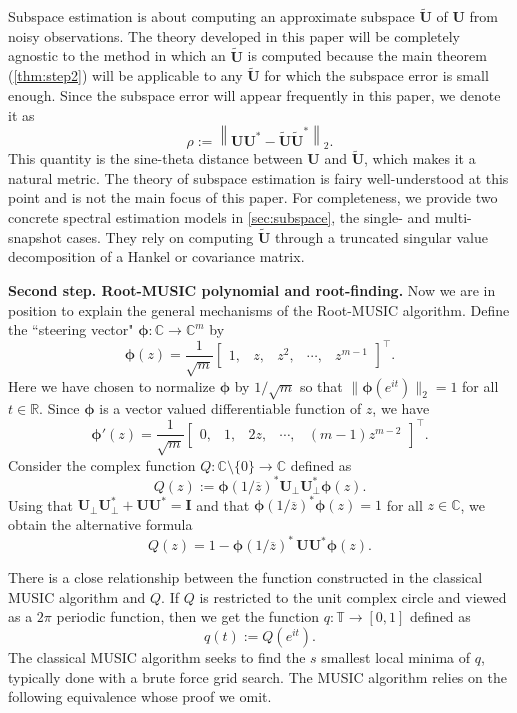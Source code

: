 \documentclass[11pt]{article}
\theoremstyle{definition}
\numberwithin{theorem}{section}
\numberwithin{equation}{section}
\def\C{\mathbb{C}}
\def\R{\mathbb{R}}
\def\T{\mathbb{T}}
\renewcommand{\tilde}{\widetilde}
\newcommand{\bfI}{{\boldsymbol I}}
\newcommand{\bfU}{{\boldsymbol U}}
\newcommand{\bfphi}{{\boldsymbol \phi}}
\numberwithin{equation}{section}
\begin{document}
Subspace estimation is about computing an approximate subspace $\tilde \bfU$ of $\bfU$ from noisy observations. The theory developed in this paper will be completely agnostic to the method in which an $\tilde \bfU$ is computed because the main theorem (\cref{thm:step2}) will be applicable to any $\tilde \bfU$ for which the subspace error is small enough. Since the subspace error will appear frequently in this paper, we denote it as
\begin{equation}
    \label{eq:subspaceerror}
    \rho := \left\|\bfU\bfU^*-\tilde \bfU\tilde \bfU^* \right\|_2.
\end{equation}
This quantity is the sine-theta distance between $\bfU$ and $\tilde \bfU$, which makes it a natural metric. The theory of subspace estimation is fairy well-understood at this point and is not the main focus of this paper. For completeness, we provide two concrete spectral estimation models in \cref{sec:subspace}, the single- and multi- snapshot cases. They rely on computing $\tilde\bfU$ through a truncated singular value decomposition of a Hankel or covariance matrix. 

{\bf Second step. Root-MUSIC polynomial and root-finding.} Now we are in position to explain the general mechanisms of the Root-MUSIC algorithm. Define the ``steering vector" $\bfphi\colon \C\to \C^m$ by
$$
\bfphi(z)
=\frac 1 {\sqrt m} \begin{bmatrix} 1, &z, &z^2,  &\cdots, &z^{m-1} \end{bmatrix}^\top.
$$
Here we have chosen to normalize $\bfphi$ by $1/\sqrt m$ so that $\|\bfphi(e^{it})\|_2=1$ for all $t\in \R$. Since $\bfphi$ is a vector valued differentiable function of $z$, we have
$$
\bfphi'(z)=\frac 1 {\sqrt m} \begin{bmatrix} 0, &1, &2z,  &\cdots, &(m-1)z^{m-2} \end{bmatrix}^\top.
$$
Consider the complex function $Q\colon \C\setminus \{0\}\to \C$ defined as 
\begin{equation}
    Q(z)
    :=\bfphi(1/\overline z)^* \bfU_\perp \bfU_\perp^* \bfphi(z). \label{eq:qdef1}
\end{equation}
Using that $\bfU_\perp \bfU_\perp^*+\bfU \bfU^*=\bfI$ and that $\bfphi(1/\overline z)^*\bfphi(z)=1$ for all $z\in \C$, we obtain the alternative formula
\begin{equation}
    Q(z)
    =1-\bfphi(1/\overline z)^* \, \bfU \bfU^* \bfphi(z). \label{eq:qdef2}
\end{equation}

There is a close relationship between the function constructed in the classical MUSIC algorithm \cite{schmidt1986multiple} and $Q$. If $Q$ is restricted to the unit complex circle and viewed as a $2\pi$ periodic function, then we get the function $q\colon \T\to [0,1]$ defined as 
$$
q(t):= Q(e^{it}). 
$$
The classical MUSIC algorithm seeks to find the $s$ smallest local minima of $q$, typically done with a brute force grid search. The MUSIC algorithm relies on the following equivalence \cite{schmidt1986multiple} whose proof we omit.
\end{document}
